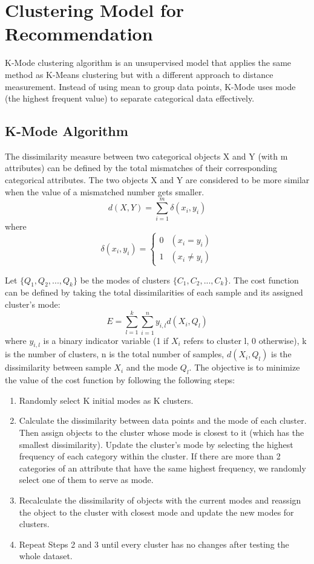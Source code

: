 \documentclass[12pt]{article}
\begin{document}
\section{Clustering Model for Recommendation}
K-Mode clustering algorithm is an unsupervised model that applies the same method as K-Means clustering but with a different approach to distance measurement. Instead of using mean to group data points, K-Mode uses mode (the highest frequent value) to separate categorical data effectively.

\subsection{K-Mode Algorithm}
The dissimilarity measure between two categorical objects X and Y (with m attributes) can be defined by the total mismatches of their corresponding categorical attributes. The two objects X and Y are considered to be more similar when the value of a mismatched number gets smaller.\citep{huang1998extensions}
        $$d(X,Y) = \sum_{i=1}^{m}\delta{(x_i,y_i)}$$ where $$\delta{(x_i,y_i)} = \left\{\begin{array}{ll} 0 & (x_i = y_i) \\
        1 & (x_i \neq y_i)\end{array}\right.$$

\vspace{0.5cm}

Let $\{Q_1,Q_2,...,Q_k\}$ be the modes of clusters $\{C_1,C_2,...,C_k\}$. The cost function can be defined by taking the total dissimilarities of each sample and its assigned cluster's mode\citep{huang1998extensions}: 
$$E = \sum_{l=1}^{k}\sum_{i=1}^{n}y_{i,l}d(X_i,Q_l)$$ 
where $y_{i,l}$ is a binary indicator variable (1 if $X_i$ refers to cluster l, 0 otherwise), k is the number of clusters, n is the total number of samples, $d(X_i,Q_l)$ is the dissimilarity between sample $X_i$ and the mode $Q_l$. The objective is to minimize the value of the cost function by following the following steps: 

\begin{enumerate}
    \item Randomly select K initial modes as K clusters.
    
    \item Calculate the dissimilarity between data points and the mode of each cluster. Then assign objects to the cluster whose mode is closest to it (which has the smallest dissimilarity). Update the cluster’s mode by selecting the highest frequency of each category within the cluster. If there are more than 2 categories of an attribute that have the same highest frequency, we randomly select one of them to serve as mode.
    
    \item Recalculate the dissimilarity of objects with the current modes and reassign the object to the cluster with closest mode and update the new modes for clusters.
    
    \item Repeat Steps 2 and 3 until every cluster has no changes after testing the whole dataset.
\end{enumerate}
\end{document}

